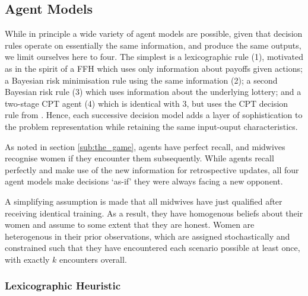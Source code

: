 \subsection{Agent Models}
\label{sub:the_agents}

While in principle a wide variety of agent models are possible, given that decision rules operate on essentially the same information, and produce the same outputs, we limit ourselves here to four. The simplest is a lexicographic rule (1), motivated as in the spirit of a \ac{FFH} \citep{Gigerenzer2004} which uses only information about payoffs given actions; a Bayesian risk minimisation rule using the same information (2); a second Bayesian risk rule (3) which uses information about the underlying lottery; and a two-stage \ac{CPT} \citep{Hau2008} agent (4) which is identical with 3, but uses the \ac{CPT} decision rule from \cite{Tversky1992}. Hence, each successive decision model adds a layer of sophistication to the problem representation while retaining the same input-ouput characteristics.

As noted in section \ref{sub:the_game}, agents have perfect recall, and midwives recognise women if they encounter them subsequently. While agents recall perfectly and make use of the new information for retrospective updates, all four agent models make decisions `as-if' they were always facing a new opponent.

A simplifying assumption is made that all midwives have just qualified after receiving identical training. As a result, they have homogenous beliefs about their women and assume to some extent that they are honest.
Women are heterogenous in their prior observations, which are assigned stochastically and constrained such that they have encountered each scenario possible at least once, with exactly \(k\) encounters overall.


\subsubsection{Lexicographic Heuristic}
\label{sub:lexico}

